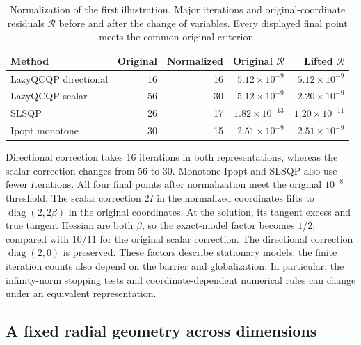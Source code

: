 \documentclass[pdflatex,sn-mathphys-num]{sn-jnl}
\theoremstyle{thmstyleone}
\theoremstyle{thmstylethree}
\begin{document}
\begin{table}[!htbp]
\centering\small
\caption{Normalization of the first illustration. Major iterations and
original-coordinate residuals $\mathcal R$ before and after the change
of variables. Every displayed final point meets the common original
criterion.}
\label{tab:normalization-control}

\begin{tabular}{lrrrr}
\toprule
Method & Original & Normalized & Original $\mathcal R$ & Lifted $\mathcal R$ \\
\midrule
LazyQCQP directional & 16 & 16 & $5.12\times10^{-9}$ & $5.12\times10^{-9}$ \\
LazyQCQP scalar & 56 & 30 & $5.12\times10^{-9}$ & $2.20\times10^{-9}$ \\
SLSQP & 26 & 17 & $1.82\times10^{-13}$ & $1.20\times10^{-11}$ \\
Ipopt monotone & 30 & 15 & $2.51\times10^{-9}$ & $2.51\times10^{-9}$ \\
\bottomrule
\end{tabular}


\end{table}

Directional correction takes 16 iterations in both representations,
whereas the scalar correction changes from 56 to 30. Monotone Ipopt
and SLSQP also use fewer iterations. All four final points after normalization
meet the original $10^{-8}$ threshold.
The scalar correction $2I$ in the normalized coordinates lifts to
$\operatorname{diag}(2,2\beta)$ in the original coordinates.
At the solution, its tangent excess and true tangent Hessian are both
$\beta$, so the exact-model factor becomes $1/2$, compared with
$10/11$ for the original scalar correction. The directional correction
$\operatorname{diag}(2,0)$ is preserved. These factors describe
stationary models; the finite iteration counts also depend on the
barrier and globalization. In particular, the infinity-norm stopping
tests and coordinate-dependent numerical rules can change under an equivalent
representation.

\subsection{A fixed radial geometry across dimensions}
\end{document}
